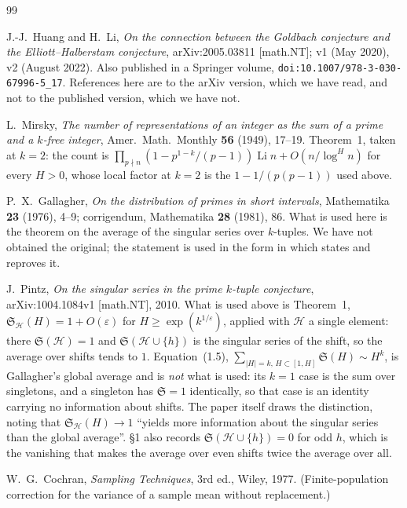 \documentclass[11pt,a4paper]{article}
\theoremstyle{plain}
\theoremstyle{definition}
\theoremstyle{remark}
\renewcommand{\SS}{\mathfrak{S}}
\begin{document}
\begin{thebibliography}{99}

 J.-J.~Huang and H.~Li, \emph{On the connection between
the Goldbach conjecture and the Elliott--Halberstam conjecture},
arXiv:2005.03811 [math.NT]; v1 (May 2020), v2 (August 2022). Also
published in a Springer volume,
\texttt{doi:10.1007/978-3-030-67996-5\_17}. References here are to the
arXiv version, which we have read, and not to the published version,
which we have not.

 L.~Mirsky, \emph{The number of representations of an
integer as the sum of a prime and a $k$-free integer}, Amer.\ Math.\
Monthly \textbf{56} (1949), 17--19. Theorem~1, taken at $k=2$: the
count is $\prod_{p\nmid n}(1-p^{1-k}/(p-1))\operatorname{Li}n
+O(n/\log^Hn)$ for every $H>0$, whose local factor at $k=2$ is the
$1-1/(p(p-1))$ used above.

 P.~X.~Gallagher, \emph{On the distribution of
primes in short intervals}, Mathematika \textbf{23} (1976), 4--9;
corrigendum, Mathematika \textbf{28} (1981), 86. What is used here is
the theorem on the average of the singular series over $k$-tuples. We
have not obtained the original; the statement is used in the form
in which \cite{Pintz} states and reproves it.

 J.~Pintz, \emph{On the singular series in the prime
$k$-tuple conjecture}, arXiv:1004.1084v1 [math.NT], 2010. What is used
above is Theorem~1, $\SS_{\mathcal H}(H)=1+O(\varepsilon)$ for
$H\ge\exp(k^{1/\varepsilon})$, applied with $\mathcal H$ a single
element: there $\SS(\mathcal H)=1$ and
$\SS(\mathcal H\cup\{h\})$ is the singular series of the shift, so the
average over shifts tends to $1$. Equation~(1.5),
$\sum_{|H|=k,\,H\subset[1,H]}\SS(H)\sim H^{k}$, is Gallagher's global
average and is \emph{not} what is used: its $k=1$ case is the sum over
singletons, and a singleton has $\SS=1$ identically, so that case is
an identity carrying no information about shifts. The paper itself
draws the distinction, noting that $\SS_{\mathcal H}(H)\to1$ ``yields
more information about the singular series than the global average''.
\S1 also records $\SS(\mathcal H\cup\{h\})=0$ for odd $h$, which is
the vanishing that makes the average over even shifts twice the
average over all.

 W.~G.~Cochran, \emph{Sampling Techniques}, 3rd ed.,
Wiley, 1977. (Finite-population correction for the variance of a
sample mean without replacement.)


\end{thebibliography}
\end{document}
